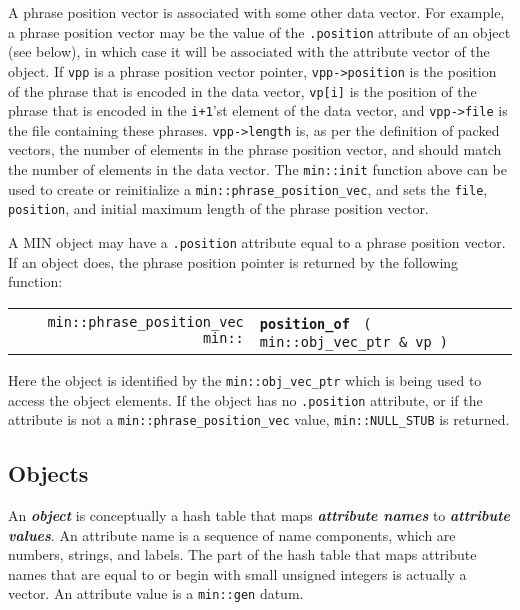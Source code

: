 \documentclass[12pt]{article}
\makeatletter
\newcommand{\key}[1]{{\bf \em #1}\index{#1}}
\newcommand{\skey}[2]{{\bf \em #1#2}\index{#1}}
\newcommand{\ttindex}[1]{\index{#1@{\tt #1}}}
\newcommand{\minindex}[1]{\ttindex{min::#1}\ttindex{#1}}
\newcommand{\EOL}{\penalty \exhyphenpenalty}
\newenvironment{indpar}[1][0.3in]%
	{\begin{list}{}%
		     {\setlength{\itemsep}{0in}%
		      \setlength{\topsep}{0in}%
		      \setlength{\parsep}{1ex}%
		      \setlength{\labelwidth}{#1}%
		      \setlength{\leftmargin}{#1}%
		      \addtolength{\leftmargin}{\labelsep}}%
	 \item}%
	{\end{list}}
\newcommand{\LABEL}[1]{\label{#1}}
\newcommand{\MINKEY}[1]{{\tt \bf #1}\minindex{#1}}
\makeatother
\begin{document}
A phrase position vector is associated with some other data vector.
For example, a phrase position vector may be the value of the
{\tt .position} attribute of an object
(see below), in which case it will be associated with
the attribute vector of the object.
If {\tt vpp} is a phrase position vector pointer, {\tt vpp->\EOL position}
is the position of the phrase that is encoded in the data vector,
{\tt vp[i]} is the position of the phrase that is encoded in
the {\tt i+1}'st element of the data vector, and
{\tt vpp->\EOL file} is the file containing these phrases.
{\tt vpp->\EOL length} is, as per the definition of packed vectors,
the number of elements in the phrase position vector, and should
match the number of elements in the data vector.
The {\tt min::\EOL init} function above can be used to create or
reinitialize a {\tt min::\EOL phrase\_\EOL position\_\EOL vec},
and sets the {\tt file}, {\tt position}, and initial maximum length
of the phrase position vector.

A MIN object may have a {\tt .position} attribute equal to a
phrase position vector.  If an object does, the phrase position
pointer is returned by the following function:

\begin{indpar}[1em]\begin{tabular}{r@{}l}
\verb|min::phrase_position_vec min::| & \MINKEY{position\_of}
    \verb| ( min::obj_vec_ptr & vp )|
\LABEL{MIN::POSITION_OF_OBJECT_VEC_PTR} \\
\end{tabular}\end{indpar}

Here the object is identified by the {\tt min::\EOL obj\_\EOL vec\_\EOL ptr}
which is being used to access the object elements.  If the
object has no {\tt .position} attribute, or if the attribute is
not a {\tt min::\EOL phrase\_\EOL position\_\EOL vec} value,
{\tt min::\EOL NULL\_\EOL STUB} is returned.

\subsection{Objects}
\label{OBJECTS}

An \key{object} is conceptually a hash table that maps
\skey{attribute name}s to \skey{attribute value}s.
An attribute name is a sequence of name components, which
are numbers, strings, and labels.
The part of the hash table that maps attribute names that are equal to
or begin with small unsigned integers is actually a vector.
An attribute value is a \verb|min::gen| datum.
\end{document}
